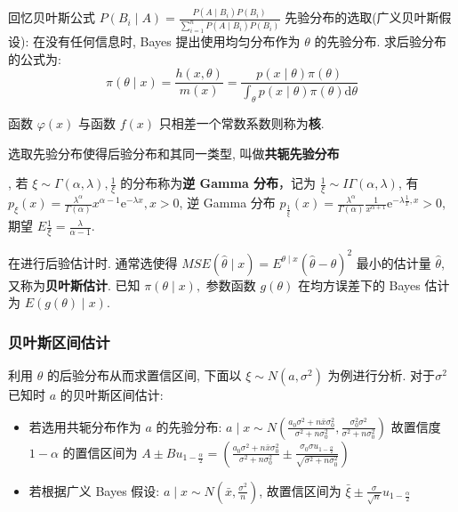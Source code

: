 \documentclass[10pt]{yerbaformat}
\begin{document}
\par 回忆贝叶斯公式 $P\left(B_{i} \mid A\right)=\frac{P\left(A \mid B_{i}\right) P\left(B_{i}\right)}{\sum_{i=1}^{n} P\left(A \mid B_{i}\right) P\left(B_{i}\right)}$ 先验分布的选取(广义贝叶斯假设): 在没有任何信息时, Bayes 提出使用均匀分布作为 $\theta$ 的先验分布. 求后验分布的公式为: $$\pi(\theta \mid x)=\frac{h(x, \theta)}{m(x)}=\frac{p(x \mid \theta) \pi(\theta)}{\int_{\theta} p(x \mid \theta) \pi(\theta) \mathrm{d} \theta}$$

\begin{definition}
    函数 $\varphi(x)$ 与函数 $f(x)$ 只相差一个常数系数则称为\textbf{核}.
\end{definition}

\begin{definition}
    选取先验分布使得后验分布和其同一类型, 叫做\textbf{共轭先验分布}
\end{definition}

\par , 若 $\xi \sim \Gamma(\alpha, \lambda), \frac{1}{\xi}$ 的分布称为\textbf{逆 Gamma 分布}，记为 $\frac{1}{\xi} \sim I \Gamma(\alpha, \lambda)$, 有 $p_{\xi}(x)=\frac{\lambda^{\alpha}}{\Gamma(\alpha)} x^{\alpha-1} \mathrm{e}^{-\lambda x}, x>0$, 逆 Gamma 分布
$p_{\frac{1}{\xi}}(x)=\frac{\lambda^{\alpha}}{\Gamma(\alpha)} \frac{1}{x^{\alpha+1}} \mathrm{e}^{-\lambda \frac{1}{x}, x}>0$, 期望 $E \frac{1}{\xi}=\frac{\lambda}{\alpha-1}$.

\par 在进行后验估计时. 通常选使得 $MSE(\hat{\theta} \mid x)=E^{\theta \mid x}(\hat{\theta}-\theta)^{2}$ 最小的估计量 $\hat{\theta}$, 又称为\textbf{贝叶斯估计}. 已知 $\pi(\theta \mid x),$ 参数函数 $g(\theta)$ 在均方误差下的 Bayes 估计为 $E(g(\theta) \mid x)$.

\subsubsection{贝叶斯区间估计}

\par 利用 $\theta$ 的后验分布从而求置信区间, 下面以 $\xi \sim N\left(a, \sigma^{2}\right)$ 为例进行分析. 对于$\sigma^{2}$ 已知时 $a$ 的贝叶斯区间估计:

\begin{itemize}
    \item 若选用共轭分布作为 $a$ 的先验分布: $a \mid x \sim N\left(\frac{a_{0} \sigma^{2}+n \bar{x} \sigma_{0}^{2}}{\sigma^{2}+n \sigma_{0}^{2}}, \frac{\sigma_{0}^{2} \sigma^{2}}{\sigma^{2}+n \sigma_{0}^{2}}\right)$ 故置信度 $1-\alpha$ 的置信区间为 $A \pm B u_{1-\frac{\alpha}{2}}=\left(\frac{a_{0} \sigma^{2}+n \bar{x} \sigma_{0}^{2}}{\sigma^{2}+n \sigma_{0}^{2}} \pm \frac{\sigma_{0} \sigma u_{1-\frac{\alpha}{2}}}{\sqrt{\sigma^{2}+n \sigma_{0}^{2}}}\right)$
    \item 若根据广义 Bayes 假设: $a \mid x \sim N\left(\bar{x}, \frac{\sigma^{2}}{n}\right)$, 故置信区间为 $\bar{\xi} \pm \frac{\sigma}{\sqrt{n}} u_{1-\frac{\alpha}{2}}$
\end{itemize}
\end{document}
